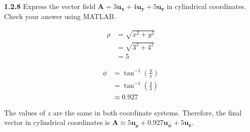 \documentclass{article}
\begin{document}
\textbf{1.2.8} Express the vector field $\mathbf{A} = 3\mathbf{u_x} + 4\mathbf{u_y} + 5\mathbf{u_z}$ in cylindrical
coordinates. Check your answer using MATLAB.\@

\begin{equation*}
	\begin{split}
		\rho & = \sqrt{x^2 + y^2} \\
		& = \sqrt{3^2 + 4^2} \\
		& = 5
	\end{split}
\end{equation*}

\begin{equation*}
	\begin{split}
		\phi & = \tan^{-1}\left(\frac{y}{x}\right) \\
		& = \tan^{-1}\left(\frac{4}{3}\right) \\
		& \approx 0.927
	\end{split}
\end{equation*}

The values of $z$ are the same in both coordinate systems. Therefore, the final vector in cylindrical coordinates is
$\mathbf{A} \approx 5\mathbf{u_\rho} + 0.927\mathbf{u_\phi} + 5\mathbf{u_z}$.
\end{document}
